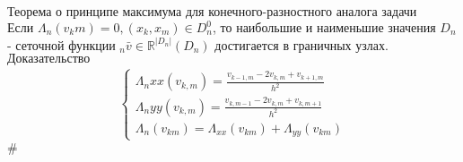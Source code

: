 \documentclass[__main__.tex]{subfiles}
\begin{document}
$\textbf{Теорема о принципе максимума для конечного-разностного аналога задачи Дирихле}$\\
Если $\Lambda_n(v_km)=0, (x_k,x_m)\in D_n^0$, то наибольшие и наименьшие значения $D_n$- сеточной функции  $_n\bar{v}\in \mathbb{R}^{|D_n|}(D_n)$ достигается в граничных узлах. \\
$\textbf{Доказательство} $
\begin{gather}
	\begin{cases}
		\Lambda_n{xx}(v_{k,m})=\frac{v_{k-1,m}-2v_{k,m}+v_{k+1,m}}{h^2}\\
		\Lambda_n{yy}(v_{k,m})=\frac{v_{k,m-1}-2v_{k,m}+v_{k,m+1}}{h^2}\\
		\Lambda_n(v_{km})=\Lambda_{xx}(v_{km})+\Lambda_{yy}(v_{km}) 
				\end{cases}
\end{gather}
$\#$

 
\end{document}
